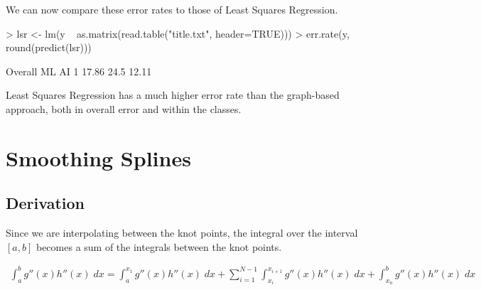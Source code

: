 \documentclass[a4paper]{article}
\begin{document}
We can now compare these error rates to those of Least Squares Regression.

\begin{Schunk}
\begin{Sinput}
> lsr <- lm(y ~ as.matrix(read.table("title.txt", header=TRUE)))
> err.rate(y, round(predict(lsr)))
\end{Sinput}
\begin{Soutput}
  Overall   ML    AI
1   17.86 24.5 12.11
\end{Soutput}
\end{Schunk}
Least Squares Regression has a much higher error rate than the graph-based
approach, both in overall error and within the classes.

\section{Smoothing Splines}
\subsection{Derivation}
Since we are interpolating between the knot points, the integral over the
interval $[a,b]$ becomes a sum of the integrals between the knot points.

\begin{align*}
  \int_a^b g''(x)h''(x)\;dx
    = \int_a^{x_1} g''(x)h''(x)\;dx + \sum_{i=1}^{N-1} \int_{x_i}^{x_{i+1}}g''(x)h''(x)\;dx
      + \int_{x_n}^b g''(x)h''(x)\;dx
\end{align*}
\end{document}

